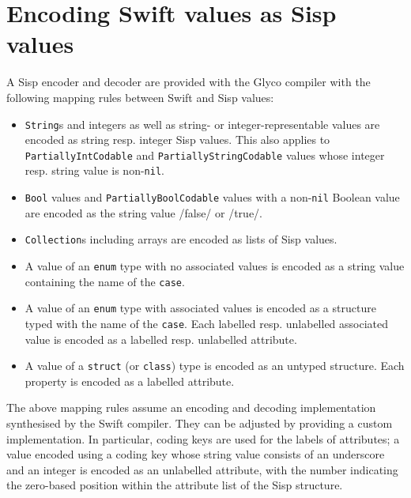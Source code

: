 \documentclass[main.tex]{subfiles}
\begin{document}
\section*{Encoding Swift values as Sisp values}
A Sisp encoder and decoder are provided with the Glyco compiler with the following mapping rules between Swift and Sisp values:
\begin{itemize}
	
	\item \texttt{String}s and integers as well as string- or integer-representable values are encoded as string resp. integer Sisp values. This also applies to \texttt{PartiallyIntCodable} and \texttt{PartiallyStringCodable} values whose integer resp. string value is non-\texttt{nil}.
	
	\item \texttt{Bool} values and \texttt{PartiallyBoolCodable} values with a non-\texttt{nil} Boolean value are encoded as the string value \iil/false/ or \iil/true/.
	
	\item \texttt{Collection}s including arrays are encoded as lists of Sisp values.
	
	\item A value of an \texttt{enum} type with no associated values is encoded as a string value containing the name of the \texttt{case}.
	
	\item A value of an \texttt{enum} type with associated values is encoded as a structure typed with the name of the \texttt{case}. Each labelled resp. unlabelled associated value is encoded as a labelled resp. unlabelled attribute.
	
	\item A value of a \texttt{struct} (or \texttt{class}) type is encoded as an untyped structure. Each property is encoded as a labelled attribute.
	
\end{itemize}

The above mapping rules assume an encoding and decoding implementation synthesised by the Swift compiler. They can be adjusted by providing a custom implementation. In particular, coding keys are used for the labels of attributes; a value encoded using a coding key whose string value consists of an underscore and an integer is encoded as an unlabelled attribute, with the number indicating the zero-based position within the attribute list of the Sisp structure.

\biblio{}
\onlyinsubfile{\glsaddall\printglossaries}
\end{document}
